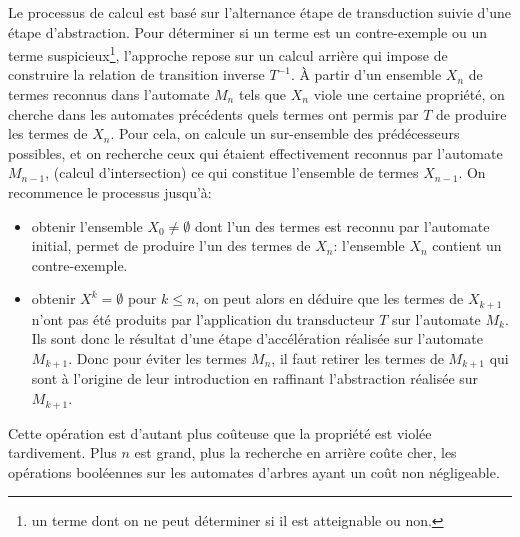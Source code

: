 Le processus de calcul est basé sur l'alternance étape de transduction
suivie d'une étape d'abstraction. Pour déterminer si un terme
est un contre-exemple ou un terme suspicieux\footnote{\footnotesize un terme dont on ne peut
déterminer si il est atteignable ou non.}, l'approche repose sur un
calcul arrière qui impose de construire la relation de transition
inverse $T^{-1}$. À partir d'un ensemble $X_n$ de termes reconnus dans l'automate $M_n$ tels que $X_n$
viole une certaine propriété, on cherche dans les automates précédents quels termes ont permis par $T$
de produire les termes de $X_n$. Pour cela, on calcule un sur-ensemble des prédécesseurs possibles, 
et on recherche ceux qui étaient effectivement reconnus par l'automate $M_{n-1}$, (calcul d'intersection)
ce qui constitue l'ensemble de termes $X_{n-1}$. On recommence le processus jusqu'à:
\begin{itemize}
\item obtenir l'ensemble $X_0 \not= \emptyset$ dont l'un des termes est reconnu par l'automate initial,
  permet de produire l'un des termes de $X_n$: l'ensemble  $X_n$ contient un contre-exemple.

\item obtenir $X^k = \emptyset$ pour $k \le n$, on peut alors en déduire 
  que les termes de $X_{k+1}$ n'ont pas été produits par l'application du transducteur $T$ sur l'automate $M_k$.
  Ils sont donc le résultat d'une étape d'accélération réalisée sur l'automate $M_{k+1}$.
  Donc pour éviter les termes $M_n$, il faut retirer les termes de $M_{k+1}$ qui sont
  à l'origine de leur introduction en raffinant l'abstraction réalisée sur $M_{k+1}$.
\end{itemize}
Cette opération est d'autant plus coûteuse que la propriété est violée tardivement. 
Plus $n$ est grand, plus la recherche en arrière coûte cher, les opérations booléennes sur
les automates d'arbres ayant un coût non négligeable.


